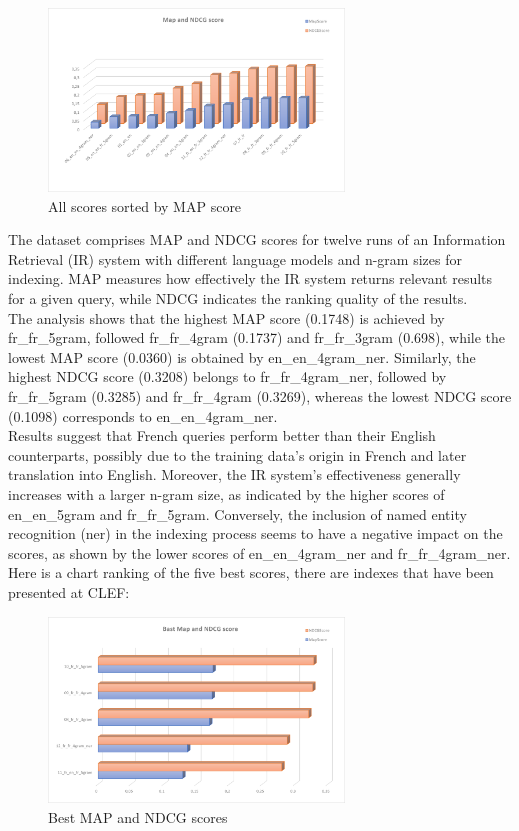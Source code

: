 \begin{figure}[h!]
	\centering
	\includegraphics[width=0.7\textwidth]{figure/allScoresSorted.png}
	\caption{All scores sorted by MAP score}
	\label{fig:sorted scores}
\end{figure}
The dataset comprises MAP and NDCG scores for twelve runs of an Information Retrieval (IR) system with different language models and n-gram sizes for indexing. MAP measures how effectively the IR system returns relevant results for a given query, while NDCG indicates the ranking quality of the results.\\
The analysis shows that the highest MAP score (0.1748) is achieved by fr\_fr\_5gram, followed fr\_fr\_4gram (0.1737) and fr\_fr\_3gram (0.698), while the lowest MAP score (0.0360) is obtained by en\_en\_4gram\_ner. Similarly, the highest NDCG score (0.3208) belongs to fr\_fr\_4gram\_ner, followed by fr\_fr\_5gram (0.3285) and fr\_fr\_4gram (0.3269), whereas the lowest NDCG score (0.1098) corresponds to en\_en\_4gram\_ner.\\
Results suggest that French queries perform better than their English counterparts, possibly due to the training data's origin in
French and later translation into English. Moreover, the IR system's effectiveness generally increases with a larger n-gram size, as indicated by the higher scores of en\_en\_5gram and fr\_fr\_5gram. Conversely, the inclusion of named entity recognition (ner) in the indexing process seems to have a negative impact on the scores, as shown by the lower scores of en\_en\_4gram\_ner and fr\_fr\_4gram\_ner.\\
Here is a chart ranking of the five best scores, there are indexes that have been presented at CLEF:
\begin{figure}[h!]
	\centering
	\includegraphics[width=0.7\textwidth]{figure/bestScores.png}
	\caption{Best MAP and NDCG scores}
	\label{fig:scores}
\end{figure}
